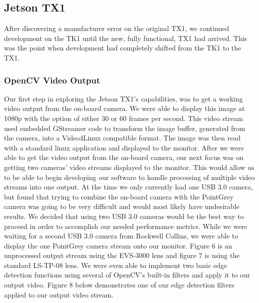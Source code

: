 \documentclass[letterpaper,10pt,titlepage]{IEEEtran}
\begin{document}
   \subsection{Jetson TX1}
   After discovering a manufacturer error on the original TX1, we continued development on the TK1 until the new, fully functional, TX1 had arrived. This was the point when development had completely shifted from the TK1 to the TX1.\\
   
   \subsubsection{OpenCV Video Output}
   Our first step in exploring the Jetson TX1's capabilities, was to get a working video output from the on-board camera. We were able to display this image at 1080p with the option of either 30 or 60 frames per second. This video stream used embedded GStreamer code to transform the image buffer, generated from the camera, into a Video4Linux compatible format. The image was then read with a standard linux application and displayed to the monitor. After we were able to get the video output from the on-board camera, our next focus was on getting two cameras' video streams displayed to the monitor. This would allow us to be able to begin developing our software to handle processing of multiple video streams into one output. At the time we only currently had one USB 3.0 camera, but found that trying to combine the on-board camera with the PointGrey camera was going to be very difficult and would most likely have undesirable results. We decided that using two USB 3.0 cameras would be the best way to proceed in order to accomplish our needed performance metrics. While we were waiting for a second USB 3.0 camera from Rockwell Collins, we were able to display the one PointGrey camera stream onto our monitor. Figure 6 is an unprocessed output stream using the EVS-3000 lens and figure 7 is using the standard LS-TP-08 lens. We were even able to implement two basic edge detection functions using several of OpenCV's built-in filters and apply it to our output video. Figure 8 below demonstrates one of our edge detection filters applied to our output video stream.\\
   
\end{document}
